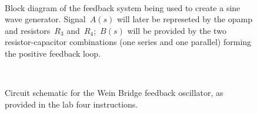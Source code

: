 \begin{figure}[H]
	\centering
	\\
	\parbox{.6\textwidth}{
	\caption[Feedback Block Diagram]{Block diagram of the feedback system being
		used to create a sine wave generator.  Signal~$A(s)$ will later be
		represeted by the opamp and resistors~$R_3$ and~$R_4$;~$B(s)$ will be
		provided by the two resistor-capacitor combinations (one series and one
		parallel) forming the positive feedback loop.}
	\label{fig:blockDiag}}
\end{figure}

\begin{figure}[H]
	\centering
	\\
	\parbox{.6\textwidth}{
	\caption[Wein Bridge Feedback Oscillator]{Circuit schematic for the Wein
		Bridge feedback oscillator, as provided in the lab four instructions.}
	\label{fig:weinBridgeSchem}}
\end{figure}
